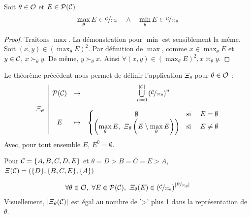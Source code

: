 \begin{theoreme}
	Soit $\theta \in \mathcal{O}$ et $E \in \mathcal{P}(\mathcal{C})$.
	\begin{equation*}
		\max_\theta E \in \nicefrac{\mathcal{C}}{\asymp_\theta}
		\quad \wedge \quad
		\min_\theta E \in \nicefrac{\mathcal{C}}{\asymp_\theta}
	\end{equation*}
\end{theoreme}

\begin{proof}
	Traitons $\max$. La démonstration pour $\min$ est sensiblement la même. \\
	Soit $(x, y) \in \left(\max_\theta E\right)^2$. Par définition de $\max$, comme $x \in \max_\theta E$ et $y \in \mathcal{C}$, $x \succ_\theta y$. De même, $y \succ_\theta x$. Ainsi $\forall (x, y) \in \left(\max_\theta E\right)^2, x \asymp_\theta y$.
\end{proof}

\begin{definition}
	Le théorème précédent nous permet de définir l'application $\varXi_\theta$ pour $\theta \in \mathcal{O}$ :
	\begin{equation}
		\varXi_\theta \
		\left| \ \begin{matrix}
			\mathcal{P}(\C) &\rightarrow& \underset{n = 0}{\overset{|\C|}{\bigcup}} \left(\nicefrac{\C}{\asymp_\theta}\right)^n \\
			~\\
			E &\mapsto& \left\{ \begin{matrix}
				\emptyset &\text{si }& E = \emptyset \\
				\left(\displaystyle \max_\theta E, \ \varXi_\theta\left(E \setminus \max_\theta E\right) \right) &\text{si }& E \neq \emptyset
			\end{matrix} \right.
		\end{matrix} \right.
	\end{equation}
	Avec, pour tout ensemble $E$, $E^0 = \emptyset$.
\end{definition}

\begin{exemple}
	Pour $\mathcal{C} = \{A, B, C, D, E\}$ et $\theta = D > B = C = E > A$,
	$\varXi(\mathcal{C}) = (\{D\}, \{B,C,E\}, \{A\})$
\end{exemple}

\begin{proposition}
	\begin{equation*}
		\forall \theta \in \mathcal{O}, \
		\forall E \in \mathcal{P}(\mathcal{C}), \
		\varXi_\theta(E) \in \left(\nicefrac{\mathcal{C}}{\asymp_\theta}\right) ^ {\left|\nicefrac{E}{\asymp_\theta}\right|}
	\end{equation*}
	Visuellement, $\left| \varXi_\theta(\mathcal{C}) \right|$ est égal au nombre de '>' plus 1 dans la représentation de $\theta$.
\end{proposition}

